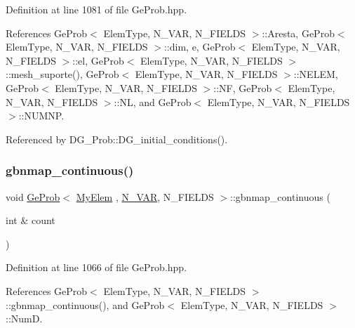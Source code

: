 Definition at line 1081 of file Ge\+Prob.\+hpp.



References Ge\+Prob$<$ Elem\+Type, N\+\_\+\+V\+A\+R, N\+\_\+\+F\+I\+E\+L\+D\+S $>$\+::\+Aresta, Ge\+Prob$<$ Elem\+Type, N\+\_\+\+V\+A\+R, N\+\_\+\+F\+I\+E\+L\+D\+S $>$\+::dim, e, Ge\+Prob$<$ Elem\+Type, N\+\_\+\+V\+A\+R, N\+\_\+\+F\+I\+E\+L\+D\+S $>$\+::el, Ge\+Prob$<$ Elem\+Type, N\+\_\+\+V\+A\+R, N\+\_\+\+F\+I\+E\+L\+D\+S $>$\+::mesh\+\_\+suporte(), Ge\+Prob$<$ Elem\+Type, N\+\_\+\+V\+A\+R, N\+\_\+\+F\+I\+E\+L\+D\+S $>$\+::\+N\+E\+L\+EM, Ge\+Prob$<$ Elem\+Type, N\+\_\+\+V\+A\+R, N\+\_\+\+F\+I\+E\+L\+D\+S $>$\+::\+NF, Ge\+Prob$<$ Elem\+Type, N\+\_\+\+V\+A\+R, N\+\_\+\+F\+I\+E\+L\+D\+S $>$\+::\+NL, and Ge\+Prob$<$ Elem\+Type, N\+\_\+\+V\+A\+R, N\+\_\+\+F\+I\+E\+L\+D\+S $>$\+::\+N\+U\+M\+NP.



Referenced by D\+G\+\_\+\+Prob\+::\+D\+G\+\_\+initial\+\_\+conditions().

\mbox{\label{classGeProb_a4a405a3f566e10cf77906d21606c97bd}} 
\subsubsection{\texorpdfstring{gbnmap\+\_\+continuous()}{gbnmap\_continuous()}\hspace{0.1cm}{\footnotesize\ttfamily [2/2]}}
{\footnotesize\ttfamily void \hyperlink{classGeProb}{Ge\+Prob}$<$ \hyperlink{DG__Prob_8h_a83cd887ced9a6587428f267e50cd4787}{My\+Elem} , \hyperlink{classED__Prob_a4e7d2ff1a8e435e336fb00c527224b5a}{N\+\_\+\+V\+AR}, N\+\_\+\+F\+I\+E\+L\+DS $>$\+::gbnmap\+\_\+continuous (\begin{DoxyParamCaption}\item[{int \&}]{count }\end{DoxyParamCaption})\hspace{0.3cm}{\ttfamily [inherited]}}



Definition at line 1066 of file Ge\+Prob.\+hpp.



References Ge\+Prob$<$ Elem\+Type, N\+\_\+\+V\+A\+R, N\+\_\+\+F\+I\+E\+L\+D\+S $>$\+::gbnmap\+\_\+continuous(), and Ge\+Prob$<$ Elem\+Type, N\+\_\+\+V\+A\+R, N\+\_\+\+F\+I\+E\+L\+D\+S $>$\+::\+NumD.

